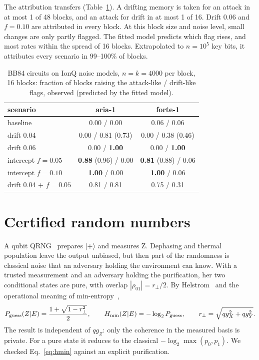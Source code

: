 \documentclass[11pt]{article}
\newcommand{\qgZ}{qg_Z}
\newcommand{\qgX}{qg_X}
\newcommand{\qgY}{qg_Y}
\begin{document}
The attribution transfers (Table~\ref{tab:ionqbb84}). A drifting memory is taken for an attack in
at most 1 of 48 blocks, and an attack for drift in at most 1 of 16. Drift 0.06 and $f=0.10$ are
attributed in every block. At this block size and noise level, small changes are only partly
flagged. The fitted model predicts which flag rises, and most rates within the spread of 16 blocks.
Extrapolated to $n=10^5$ key bits, it attributes every scenario in 99--100\% of blocks.

\begin{table}[t]
\centering\small
\caption{BB84 circuits on IonQ noise models, $n=k=4000$ per block, 16 blocks: fraction of blocks
raising the attack-like / drift-like flags, observed (predicted by the fitted model).}
\label{tab:ionqbb84}
\begin{tabular}{lcc}
\toprule
scenario & aria-1 & forte-1\\
\midrule
baseline & 0.00 / 0.00 & 0.06 / 0.06\\
drift 0.04 & 0.00 / 0.81 (0.73) & 0.00 / 0.38 (0.46)\\
drift 0.06 & 0.00 / \textbf{1.00} & 0.00 / \textbf{1.00}\\
intercept $f=0.05$ & \textbf{0.88} (0.96) / 0.00 & \textbf{0.81} (0.88) / 0.06\\
intercept $f=0.10$ & \textbf{1.00} / 0.00 & \textbf{1.00} / 0.06\\
drift 0.04 + $f=0.05$ & 0.81 / 0.81 & 0.75 / 0.31\\
\bottomrule
\end{tabular}
\end{table}

\section{Certified random numbers}\label{sec:qrng}

A qubit QRNG~\cite{herrero2017} prepares $|+\rangle$ and measures Z. Dephasing and thermal
population leave the output unbiased, but then part of the randomness is classical noise that an
adversary holding the environment can know. With a trusted measurement and an adversary holding the
purification, her two conditional states are pure, with overlap $|\rho_{01}|=r_\perp/2$. By
Helstrom~\cite{helstrom1976} and the operational meaning of min-entropy~\cite{konig2009},
\begin{equation}\label{eq:hmin}
P_{\rm guess}(Z|E)=\frac{1+\sqrt{1-r_\perp^2}}{2},\qquad
H_{\min}(Z|E)=-\log_2P_{\rm guess},\qquad r_\perp=\sqrt{\qgX^2+\qgY^2}.
\end{equation}
The result is independent of $\qgZ$: only the coherence in the measured basis is private. For a pure
state it reduces to the classical $-\log_2\max(p_0,p_1)$. We checked Eq.~\eqref{eq:hmin} against an
explicit purification.
\end{document}
